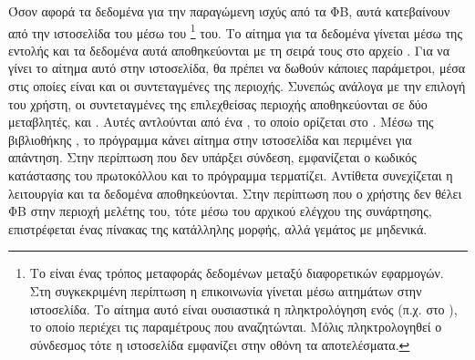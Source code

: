 \documentclass[12pt]{report}
\begin{document}
Όσον αφορά τα δεδομένα για την παραγώμενη ισχύς από τα ΦΒ, αυτά κατεβαίνουν από την ιστοσελίδα του {} μέσω του {}
\footnote{Το {} είναι ένας τρόπος μεταφοράς δεδομένων μεταξύ διαφορετικών
εφαρμογών. Στη συγκεκριμένη περίπτωση η επικοινωνία γίνεται μέσω αιτημάτων στην ιστοσελίδα. Το αίτημα αυτό είναι ουσιαστικά η πληκτρολόγηση ενός {} (π.χ. στο {}), το οποίο
περιέχει τις παραμέτρους που αναζητώνται. Μόλις πληκτρολογηθεί ο σύνδεσμος τότε η ιστοσελίδα εμφανίζει στην οθόνη τα αποτελέσματα.} του. Το αίτημα για τα δεδομένα γίνεται μέσω της εντολής {} 
και τα δεδομένα αυτά αποθηκεύονται με τη σειρά τους στο αρχείο {}. Για να γίνει το αίτημα αυτό στην ιστοσελίδα, θα πρέπει να δωθούν κάποιες παράμετροι, μέσα στις οποίες είναι και οι συντεταγμένες της 
περιοχής. Συνεπώς ανάλογα με την επιλογή του χρήστη, οι συντεταγμένες της επιλεχθείσας περιοχής αποθηκεύονται σε δύο μεταβλητές, {} και {}. Αυτές αντλούνται από ένα {}, το οποίο
ορίζεται στο {}. Μέσω της βιβλιοθήκης {}, το πρόγραμμα κάνει αίτημα στην ιστοσελίδα και περιμένει για απάντηση. Στην περίπτωση που δεν υπάρξει σύνδεση, εμφανίζεται ο κωδικός κατάστασης του 
πρωτοκόλλου {} και το πρόγραμμα τερματίζει. Αντίθετα συνεχίζεται η λειτουργία και τα δεδομένα αποθηκεύονται. Στην περίπτωση που ο χρήστης δεν θέλει ΦΒ στην περιοχή μελέτης του, τότε μέσω του αρχικού ελέγχου της
συνάρτησης, επιστρέφεται ένας πίνακας της κατάλληλης μορφής, αλλά γεμάτος με μηδενικά.

{}
\end{document}
